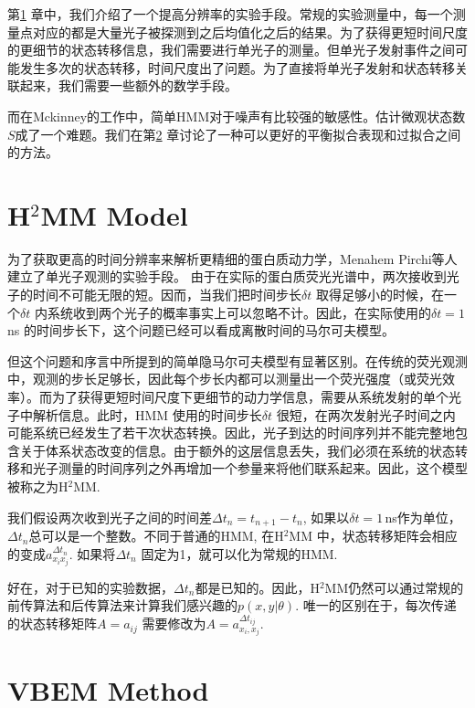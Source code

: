 \documentclass[11pt, a4paper]{article}
\begin{document}
第\ref{chapter:H2MM} 章中，我们介绍了一个提高分辨率的实验手段。常规的实验测量中，每一个测量点对应的都是大量光子被探测到之后均值化之后的结果。为了获得更短时间尺度的更细节的状态转移信息，我们需要进行单光子的测量。但单光子发射事件之间可能发生多次的状态转移，时间尺度出了问题。为了直接将单光子发射和状态转移关联起来，我们需要一些额外的数学手段。

而在Mckinney的工作中，简单HMM对于噪声有比较强的敏感性。估计微观状态数$S$成了一个难题。我们在第\ref{chapter:VBEM} 章讨论了一种可以更好的平衡拟合表现和过拟合之间的方法。


\section{H$^2$MM Model}\label{chapter:H2MM}

    为了获取更高的时间分辨率来解析更精细的蛋白质动力学，Menahem Pirchi等人建立了单光子观测的实验手段\cite{H2MM}。 由于在实际的蛋白质荧光光谱中，两次接收到光子的时间不可能无限的短。因而，当我们把时间步长$\delta t$ 取得足够小的时候，在一个$\delta t$ 内系统收到两个光子的概率事实上可以忽略不计。因此，在实际使用的$\delta t = 1\,$ns 的时间步长下，这个问题已经可以看成离散时间的马尔可夫模型。

    但这个问题和序言中所提到的简单隐马尔可夫模型有显著区别。在传统的荧光观测中，观测的步长足够长，因此每个步长内都可以测量出一个荧光强度（或荧光效率）。而为了获得更短时间尺度下更细节的动力学信息，需要从系统发射的单个光子中解析信息。此时，HMM 使用的时间步长$\delta t$ 很短，在两次发射光子时间之内可能系统已经发生了若干次状态转换。因此，光子到达的时间序列并不能完整地包含关于体系状态改变的信息。由于额外的这层信息丢失，我们必须在系统的状态转移和光子测量的时间序列之外再增加一个参量来将他们联系起来。因此，这个模型被称之为H$^2$MM.

    我们假设两次收到光子之间的时间差$\Delta t_n = t_{n+1}-t_n$, 如果以$\delta t=1\,$ns作为单位，$\Delta t_n$总可以是一个整数。不同于普通的HMM, 在H$^2$MM 中，状态转移矩阵会相应的变成$a_{x_ix_j}^{\Delta t_n}$. 如果将$\Delta t_n$ 固定为1，就可以化为常规的HMM.

    好在，对于已知的实验数据，$\Delta t_n$都是已知的。因此，H$^2$MM仍然可以通过常规的前传算法和后传算法来计算我们感兴趣的$p(x,y|\theta)$. 唯一的区别在于，每次传递的状态转移矩阵$A=a_{ij}$ 需要修改为$A=a^{\Delta t_{ij}}_{x_i, x_j}$.







\section{VBEM Method}\label{chapter:VBEM}
\end{document}
